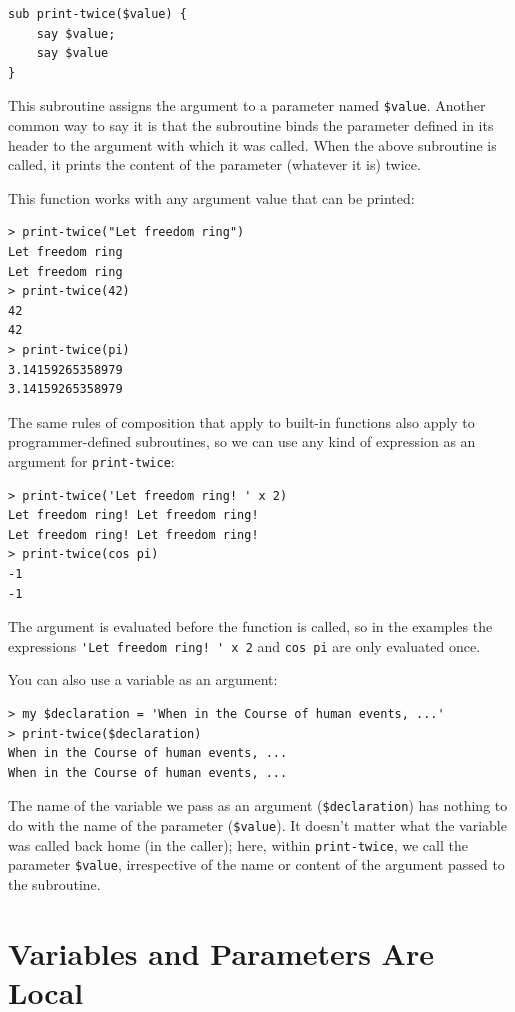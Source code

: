 \begin{verbatim}
sub print-twice($value) {
    say $value;
    say $value
}
\end{verbatim}
%
This subroutine assigns the argument to a parameter
named \verb"$value". Another common way to say it is 
that the subroutine binds the parameter defined in its 
header to the argument with which it was called. When the 
above subroutine is called, it prints the content of the 
parameter (whatever it is) twice.

This function works with any argument value that can be printed:

\begin{verbatim}
> print-twice("Let freedom ring")
Let freedom ring
Let freedom ring
> print-twice(42)
42
42
> print-twice(pi)
3.14159265358979
3.14159265358979
\end{verbatim}
%
The same rules of composition that apply to built-in functions also
apply to programmer-defined subroutines, so we can use any kind of expression
as an argument for \verb"print-twice":

\begin{verbatim}
> print-twice('Let freedom ring! ' x 2)
Let freedom ring! Let freedom ring! 
Let freedom ring! Let freedom ring! 
> print-twice(cos pi)
-1
-1
\end{verbatim}
%
The argument is evaluated before the function is called, so
in the examples the expressions \verb"'Let freedom ring! ' x 2" 
and {\tt cos pi} are only evaluated once.

You can also use a variable as an argument:

\begin{verbatim}
> my $declaration = 'When in the Course of human events, ...'
> print-twice($declaration)
When in the Course of human events, ...
When in the Course of human events, ...
\end{verbatim}
%
The name of the variable we pass as an argument (\verb"$declaration") 
has nothing to do with the name of the parameter (\verb"$value"). It
doesn't matter what the variable was called back home (in the caller);
here, within \verb"print-twice", we call the parameter \verb"$value", 
irrespective of the name or content of the argument passed to the 
subroutine.


\section{Variables and Parameters Are Local}
\label{localvar}

